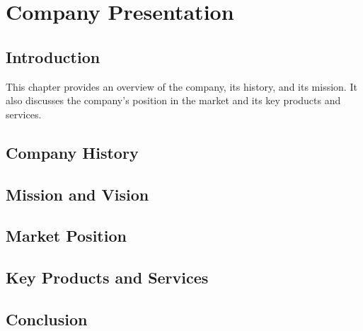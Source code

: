 \newpage
\chapter{Company Presentation}
\section{Introduction}
This chapter provides an overview of the company, its history, and its mission. It also discusses the company's position in the market and its key products and services.
\section{Company History}
\lipsum[1] %
\section{Mission and Vision}
\lipsum[3] %
\section{Market Position}
\lipsum[3] %
\section{Key Products and Services}
\lipsum[4] %
\section{Conclusion}
\lipsum[5] %
